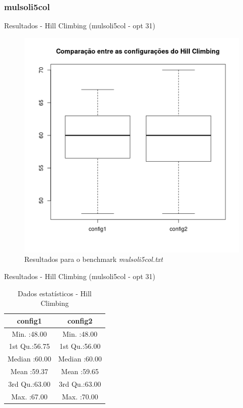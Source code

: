 \documentclass[compress, hide notes]{beamer}
\begin{document}
    	\subsubsection{mulsoli5col}
		
        \begin{frame}{Resultados - Hill Climbing (mulsoli5col - opt 31)}
        
        	\begin{figure}[H]
			\centering
            \label{fig:sol-hc-mulsoli5col}
            \includegraphics[width=0.6\linewidth]{img/hill-sol-mulsoli5col.png}
            \caption[Resultados para o benchmark mulsoli5col.txt]{Resultados para o benchmark \textit{mulsoli5col.txt}}
			\end{figure}

		\end{frame}
        
        
        \begin{frame}{Resultados - Hill Climbing (mulsoli5col - opt 31)}
        
        	\begin{table}[H]
            \centering
              \begin{tabular}{c|c}
              
               \textbf{config1}       &  \textbf{config2}                        \\ \hline \hline
               Min.   :48.00 &          Min.   :48.00          \\ \hline
               1st Qu.:56.75 &          1st Qu.:56.00          \\ \hline
               Median :60.00 &          Median :60.00          \\ \hline
               Mean   :59.37 &          Mean   :59.65          \\ \hline
               3rd Qu.:63.00 &          3rd Qu.:63.00          \\ \hline
               Max.   :67.00 &          Max.   :70.00          \\ 
              \end{tabular}
              \caption {Dados estatísticos - Hill Climbing}
        	\end{table}

		\end{frame}
        
\end{document}

